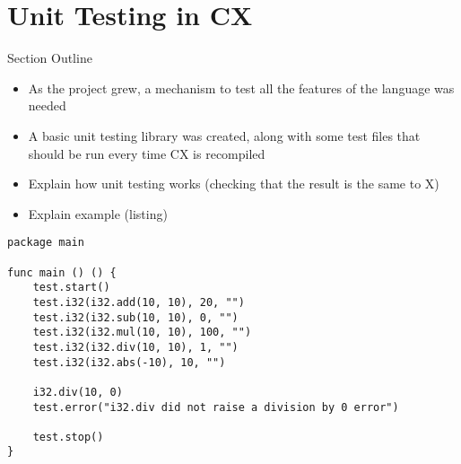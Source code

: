 \documentclass[11pt,fleqn,openany]{book} %
\begin{document}

\chapter{Unit Testing in CX}
\label{chapter:unit-testing-in-cx}

\begin{remark}
Section Outline
    \begin{itemize}
    	\item As the project grew, a mechanism to test all the features of the language was needed
        \item A basic unit testing library was created, along with some test files that should be run every time CX is recompiled
        \item Explain how unit testing works (checking that the result is the same to X)
        \item Explain example (listing)
    \end{itemize}
\end{remark}

\begin{lstlisting}[caption={Using Genetic Programming to Evolve a Function},captionpos=b,label={listing:genetic-programming-example}]
package main

func main () () {
	test.start()
	test.i32(i32.add(10, 10), 20, "")
	test.i32(i32.sub(10, 10), 0, "")
	test.i32(i32.mul(10, 10), 100, "")
	test.i32(i32.div(10, 10), 1, "")
	test.i32(i32.abs(-10), 10, "")

	i32.div(10, 0)
	test.error("i32.div did not raise a division by 0 error")
    
    test.stop()
}
\end{lstlisting}
\end{document}
